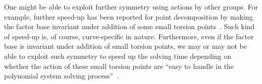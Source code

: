One might be able to exploit further symmetry using actions by other
groups.
%
For example, further speed-up has been reported for point
decomposition by making the factor base invariant under addition of
some small torsion
points~\cite{DBLP:conf/eurocrypt/FaugereHJRV14,DBLP:conf/indocrypt/GalbraithG14}.
%
Such kind of speed-up is, of course, curve-specific in nature.
%
Furthermore, even if the factor base is invariant under addition of
small torsion points, we may or may not be able to exploit such
symmetry to speed up the solving time depending on whether the action
of these small torsion points are ``easy to handle in the polynomial
system solving process''~\cite{DBLP:conf/eurocrypt/FaugereHJRV14}.
